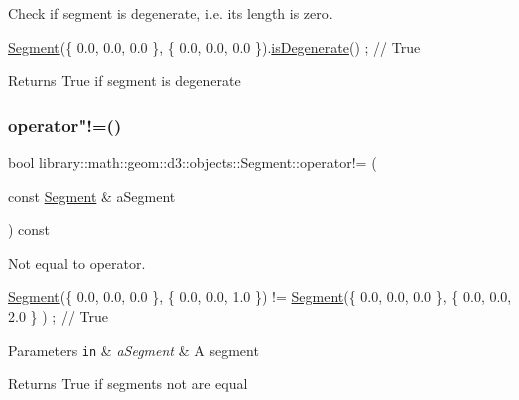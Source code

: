 Check if segment is degenerate, i.\+e. its length is zero. 


\begin{DoxyCode}
\hyperlink{classlibrary_1_1math_1_1geom_1_1d3_1_1objects_1_1_segment_a5562342d1edf2f52e37ce1bc138ee7d7}{Segment}(\{ 0.0, 0.0, 0.0 \}, \{ 0.0, 0.0, 0.0 \}).\hyperlink{classlibrary_1_1math_1_1geom_1_1d3_1_1objects_1_1_segment_a11324bd27db3ef9d931fdee763246759}{isDegenerate}() ; \textcolor{comment}{// True}
\end{DoxyCode}


\begin{DoxyReturn}{Returns}
True if segment is degenerate 
\end{DoxyReturn}
\mbox{\label{classlibrary_1_1math_1_1geom_1_1d3_1_1objects_1_1_segment_ad408a3c17a4048183c4b646ec6cf91e9}} 
\subsubsection{\texorpdfstring{operator"!=()}{operator!=()}}
{\footnotesize\ttfamily bool library\+::math\+::geom\+::d3\+::objects\+::\+Segment\+::operator!= (\begin{DoxyParamCaption}\item[{const \hyperlink{classlibrary_1_1math_1_1geom_1_1d3_1_1objects_1_1_segment}{Segment} \&}]{a\+Segment }\end{DoxyParamCaption}) const}



Not equal to operator. 


\begin{DoxyCode}
\hyperlink{classlibrary_1_1math_1_1geom_1_1d3_1_1objects_1_1_segment_a5562342d1edf2f52e37ce1bc138ee7d7}{Segment}(\{ 0.0, 0.0, 0.0 \}, \{ 0.0, 0.0, 1.0 \}) != \hyperlink{classlibrary_1_1math_1_1geom_1_1d3_1_1objects_1_1_segment_a5562342d1edf2f52e37ce1bc138ee7d7}{Segment}(\{ 0.0, 0.0, 0.0 \}, \{ 0.0, 0.0, 2.0 \}
      ) ; \textcolor{comment}{// True}
\end{DoxyCode}



\begin{DoxyParams}[1]{Parameters}
\mbox{\tt in}  & {\em a\+Segment} & A segment \\
\hline
\end{DoxyParams}
\begin{DoxyReturn}{Returns}
True if segments not are equal 
\end{DoxyReturn}
\mbox{\label{classlibrary_1_1math_1_1geom_1_1d3_1_1objects_1_1_segment_af6b462e74438f79ec6162fdefdfcb887}} 
